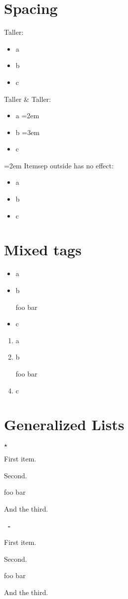 \documentclass{article}
\begin{document}
\section{Spacing}
Taller:
\begin{itemize}
\itemsep=2em
\item a
\item b
\item c
\end{itemize}

Taller \& Taller:
\begin{itemize}
\item a
\itemsep=2em
\item b
\itemsep=3em
\item c
\end{itemize}

{\itemsep=2em
Itemsep outside has no effect:
\begin{itemize}
\item a
\item b
\item c
\end{itemize}}

\section{Mixed tags}
\begin{itemize}
\item a
\item b
\item[foo] bar
\item c
\end{itemize}

\begin{enumerate}
\item a
\item b
\item[foo] bar
\item c
\end{enumerate}

\section{Generalized Lists}
\begin{list}{$\star$}{}
   \item First item.
   \item Second.
   \item[foo] bar
   \item And the third.
\end{list}


\begin{list}{\textbf{\thesection \ - \theexer}}{}
   \item First item.
   \item Second.
   \item[foo] bar
   \item And the third.
\end{list}
\end{document}
